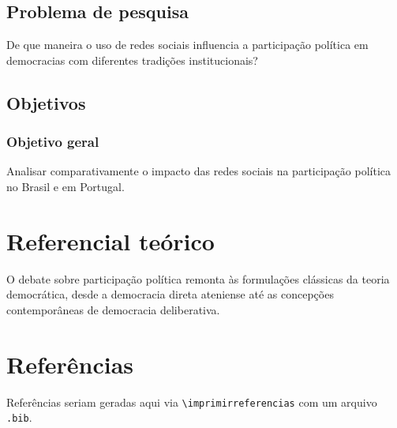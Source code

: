 \documentclass{abnt-unb-B}
\begin{document}
\section{Problema de pesquisa}

De que maneira o uso de redes sociais influencia a participação
política em democracias com diferentes tradições institucionais?

\section{Objetivos}

\subsection{Objetivo geral}

Analisar comparativamente o impacto das redes sociais na
participação política no Brasil e em Portugal.

\chapter{Referencial teórico}

O debate sobre participação política remonta às formulações
clássicas da teoria democrática, desde a democracia direta
ateniense até as concepções contemporâneas de democracia
deliberativa.

\postextual

\chapter*{Referências}

{\singlespacing
Referências seriam geradas aqui via \texttt{\textbackslash imprimirreferencias}
com um arquivo \texttt{.bib}.}
\end{document}
